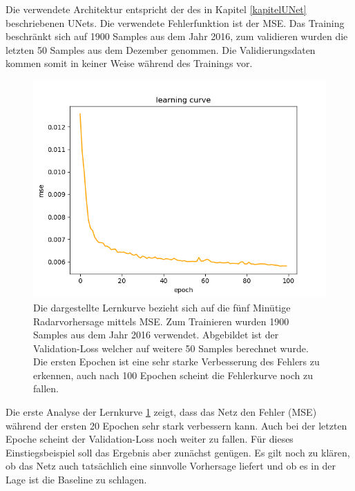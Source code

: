 Die verwendete Architektur entspricht der des in Kapitel \ref{kapitelUNet} beschriebenen UNets. Die verwendete Fehlerfunktion ist der MSE. Das Training beschränkt sich auf 1900 Samples aus dem Jahr 2016, zum validieren wurden die letzten 50 Samples aus dem Dezember genommen. Die Validierungsdaten kommen somit in keiner Weise während des Trainings vor.
\begin{figure}[h]
	\centering
	\includegraphics[width=\linewidth]{pics/mse_learncurve.png}
	\caption[Lernkurve des UNets zur fünf Minuten Vorhersage]{Die dargestellte Lernkurve bezieht sich auf die fünf Minütige Radarvorhersage mittels MSE. Zum Trainieren wurden 1900 Samples aus dem Jahr 2016 verwendet. Abgebildet ist der Validation-Loss welcher auf weitere 50 Samples berechnet wurde. Die ersten Epochen ist eine sehr starke Verbesserung des Fehlers zu erkennen, auch nach 100 Epochen scheint die Fehlerkurve noch zu fallen.}
	\label{mseLC}
\end{figure}

Die erste Analyse der Lernkurve \ref{mseLC} zeigt, dass das Netz den Fehler (MSE) während der ersten 20 Epochen sehr stark verbessern kann. Auch bei der letzten Epoche scheint der Validation-Loss noch weiter zu fallen. Für dieses Einstiegsbeispiel soll das Ergebnis aber zunächst genügen. Es gilt noch zu klären, ob das Netz auch tatsächlich eine sinnvolle Vorhersage liefert und ob es in der Lage ist die Baseline zu schlagen. 

